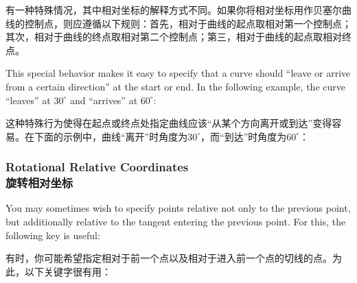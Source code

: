 有一种特殊情况，其中相对坐标的解释方式不同。如果你将相对坐标用作贝塞尔曲线的控制点，则应遵循以下规则：首先，相对于曲线的起点取相对第一个控制点；其次，相对于曲线的终点取相对第二个控制点；第三，相对于曲线的起点取相对终点。


This special behavior makes it easy to specify that a curve should ``leave or
arrive from a certain direction'' at the start or end. In the following
example, the curve ``leaves'' at $30^\circ$ and ``arrives'' at $60^\circ$:


这种特殊行为使得在起点或终点处指定曲线应该“从某个方向离开或到达”变得容易。在下面的示例中，曲线“离开”时角度为$30^\circ$，而“到达”时角度为$60^\circ$：

%
\begin{codeexample}[]
\end{codeexample}


\subsubsection{Rotational Relative Coordinates\\旋转相对坐标}

You may sometimes wish to specify points relative not only to the previous
point, but additionally relative to the tangent entering the previous point.
For this, the following key is useful:


有时，你可能希望指定相对于前一个点以及相对于进入前一个点的切线的点。为此，以下关键字很有用：

